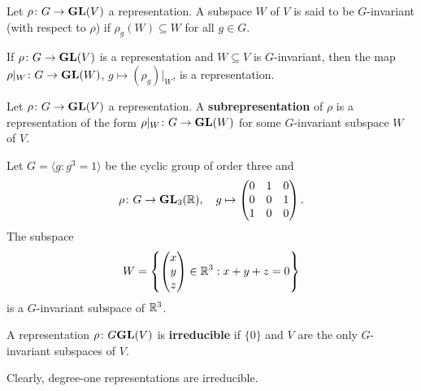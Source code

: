 \begin{definition}
    Let $\rho\colon G\to\mathbf{GL}(V)$
    a representation. A subspace $W$ of $V$ is said to be $G$-invariant (with respect to $\rho$)
    if $\rho_g(W)\subseteq W$ for all $g\in G$. 
\end{definition}

If $\rho\colon G\to\mathbf{GL}(V)$ is a representation and $W\subseteq V$ is $G$-invariant, then
the map $\rho|_W\colon G\to\mathbf{GL}(W)$, $g\mapsto (\rho_g)|_W$, is a representation.   

\begin{definition}
    Let $\rho\colon G\to\mathbf{GL}(V)$
    a representation. A \textbf{subrepresentation} of $\rho$ is a representation
    of the form $\rho|_W\colon G\to\mathbf{GL}(W)$ for some $G$-invariant subspace $W$ of $V$. 
\end{definition}

\begin{example}
    Let $G=\langle g:g^3=1\rangle$ be the 
    cyclic group of order three  
    and 
    \[
    \rho\colon G\to\mathbf{GL}_3(\mathbb{R}),
    \quad
    g\mapsto\begin{pmatrix}
        0&1&0\\
        0&0&1\\
        1&0&0
    \end{pmatrix}.
    \]
    The subspace
    \[
    W=\left\{
    \begin{pmatrix}
    x\\
    y\\
    z
    \end{pmatrix}\in\mathbb{R}^3:x+y+z=0\right\}
    \]
    is a $G$-invariant subspace of $\mathbb{R}^3$. 
\end{example}

\begin{definition}
    A representation $\rho\colon G\mathbf{GL}(V)$ is \textbf{irreducible} if
    $\{0\}$ and $V$ are the only $G$-invariant subspaces of $V$. 
\end{definition}

Clearly, degree-one representations are irreducible.

